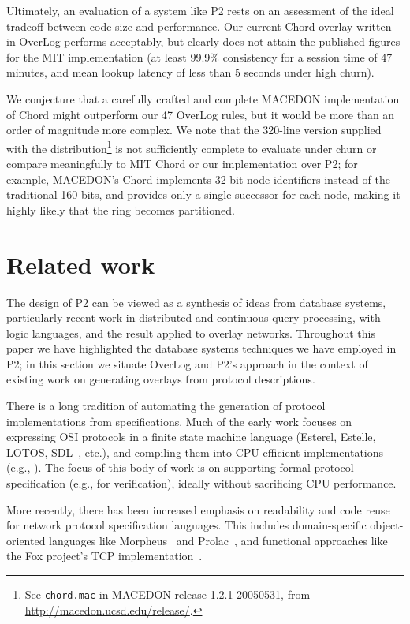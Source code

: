 \documentclass{sig-alt-full}
\def\Sys{P2\xspace}
\def\Lang{OverLog\xspace}
\def\PChordLines{47\xspace}
\begin{document}
Ultimately, an evaluation of a system like \Sys rests on an assessment
of the ideal tradeoff between code size and performance.  Our current
Chord overlay written in \Lang performs acceptably, but clearly does not
attain the published figures for the MIT implementation (at least 99.9\%
consistency for a session time of 47 minutes, and mean lookup latency of
less than 5 seconds under high churn). 

We conjecture that a carefully crafted and complete MACEDON
implementation of Chord might outperform our \PChordLines 
\Lang rules, but it would be more than an order of magnitude more complex.  
We note that the 320-line version supplied with the 
distribution\footnote{See \texttt{chord.mac} in MACEDON release
1.2.1-20050531, from \url{http://macedon.ucsd.edu/release/}.}
is not sufficiently complete to evaluate under churn or compare
meaningfully to MIT Chord or our implementation over P2; for example,
MACEDON's Chord implements 32-bit node identifiers instead of the
traditional 160 bits, and provides only a single successor for each
node, making it highly likely that the ring becomes partitioned.


\section{Related work}
\label{sec:related}
The design of \Sys can be viewed as a synthesis of ideas from database
systems, particularly recent work in distributed and continuous query
processing, with logic languages, and the result applied to overlay
networks.   Throughout this paper we have highlighted the database
systems techniques we have employed in \Sys; in this section we
situate \Lang and \Sys's approach in the context of existing work on
generating overlays from protocol descriptions. 

There is a long tradition of automating the generation of protocol
implementations from specifications.  Much of the early work focuses
on expressing OSI protocols in a finite state machine language
(Esterel, Estelle, LOTOS, SDL~\cite{esterel,fdt-book}, etc.), and
compiling them into CPU-efficient implementations
(e.g., \cite{dabbous-sigcomm96,vuong-estelle-tose88}).  The focus of
this body of work is on supporting formal protocol specification
(e.g., for verification), ideally without sacrificing CPU performance.

More recently, there has been increased emphasis on readability and
code reuse for network protocol specification languages.  This
includes domain-specific object-oriented languages like
Morpheus~\cite{morpheus} and Prolac~\cite{prolac}, and functional
approaches like the Fox project's TCP implementation~\cite{fox}.
\end{document}
